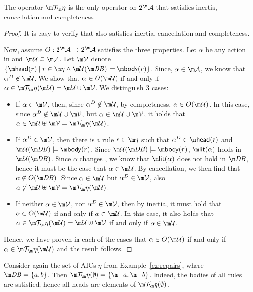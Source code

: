 \begin{proposition}
 The operator $\Op$ is the only operator on $2^\acts$ that satisfies inertia, cancellation and completeness. 
\end{proposition}
\begin{proof}
 It is easy to verify that \Op also satisfies inertia, cancellation and completeness.
 

 Now, assume $O: 2^\acts \to 2^\acts$ satisfies the three properties. Let $\alpha$ be any action in \acts and $\UU\subseteq \acts$. 
 Let $\VV$ denote $\{\head(r)\mid r\in \aics \land \UU(\db)\models\body(r)\}$. 
 Since, $\alpha \in \acts$, we know that $\alpha^D\not \in \UU$. We show that $\alpha \in O(\UU)$ if and only if $\alpha \in \Op(\UU) = \UU\uplus \VV $. 
 We distinguish 3 cases:
 \begin{itemize}
  \item If $\alpha \in \VV$, then, since $\alpha^D\not\in \UU$, by completeness, $\alpha \in O(\UU)$. In this case, since $\alpha^D\not \in \UU\cup \VV$, but $\alpha \in \UU\cup\VV$, it holds that $\alpha \in \UU \uplus \VV = \Op(\UU)$. 
  \item If $\alpha^D \in \VV$, then there is a rule $r\in \aics$ such that $\alpha^D\in \head(r)$ and $\UU(\db)\models \body(r)$. Since $\UU(\db)\models \body(r)$, $\litof(\alpha)$ holds in $\UU(\db)$. Since $\alpha$ changes \db, we know that $\litof(\alpha)$ does not hold in $\db$, hence it must be the case that $\alpha \in \UU$. By cancellation, we then find that $\alpha\not\in O(\db)$. Since $\alpha \in \UU$ but $\alpha^D\in \VV$, also $\alpha\not\in \UU\uplus\VV=\Op(\UU)$.
  \item If neither $\alpha\in\VV$, nor $\alpha^D\in\VV$, then by inertia, it must hold that $\alpha \in O(\UU)$ if and only if $\alpha\in \UU$. In this case, it also holds that $\alpha \in \Op(\UU) = \UU \uplus\VV$ if and only if $\alpha \in \UU$.
  \end{itemize}
  Hence, we have proven in each of the cases that $\alpha \in O(\UU)$ if and only if $\alpha \in \Op(\UU)$ and the result follows. 
\end{proof}



\begin{example}
  Consider again the set of AICs $\eta$ from Example~\ref{ex:repairs}, where
  $\db=\{a,b\}$.
  Then $\Op(\emptyset)=\{\remove a, \remove b\}$. Indeed, the bodies of all rules are satisfied; hence all heads are elements of $\Op(\emptyset)$.
\end{example}

